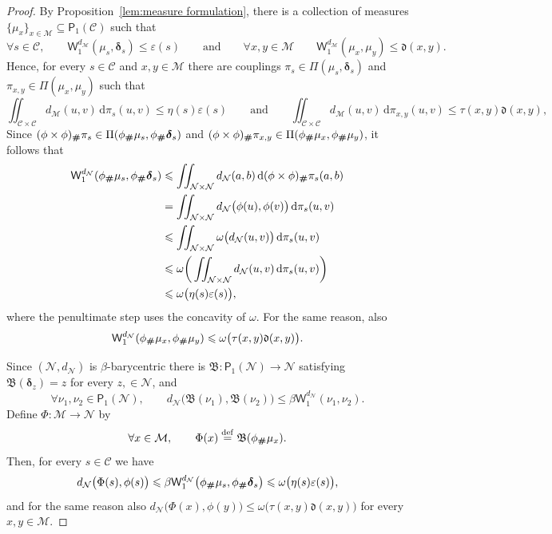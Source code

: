 \documentclass[11pt,reqno]{amsart}
\renewcommand{\le}{\leqslant}
\newcommand{\ud}[0]{\,\mathrm{d}}
\newcommand{\bd}{\boldsymbol{\delta}}
\newcommand{\NN}{\mathcal{N}}
\renewcommand{\bd}{\boldsymbol{\delta}}
\newcommand{\e}{\varepsilon}
\theoremstyle{remark}
\newcommand{\MM}{\mathcal{M}}
\renewcommand{\subset}{\subseteq}
\newcommand{\W}{\mathsf{W}}
\newcommand{\eqdef}{\stackrel{\mathrm{def}}{=}}
\newcommand{\sub}{\mathscr{C}}
\renewcommand{\1}{\mathbf 1}
\begin{document}
\begin{proof} By Proposition~\ref{lem:measure formulation}, there is a collection of measures $\{\mu_x\}_{x\in \MM}\subset  \mathsf{P}_1(\sub)$ such that
$$
\forall s\in \sub,\qquad \W_1^{d_\MM}(\mu_s,\bd_s)\le \e(s) \qquad \mathrm{and}\qquad   \forall x,y\in \MM\qquad \W_1^{d_\MM}(\mu_x,\mu_y)\le \mathfrak{d}(x,y).
$$
Hence, for every $s\in \sub$ and $x,y\in \MM$ there are couplings $\pi_s\in \Pi(\mu_s,\bd_s)$ and $\pi_{x,y}\in \Pi(\mu_x,\mu_y)$ such that
$$
\iint_{\sub\times \sub} d_\MM(u,v)\ud\pi_s(u,v)\le \eta(s)\e(s)\qquad\mathrm{and}\qquad \iint_{\sub\times \sub} d_\MM(u,v)\ud\pi_{x,y}(u,v)\le \tau(x,y)\mathfrak{d}(x,y),
$$
Since $(\phi\times \phi)_{\textbf \#} \pi_{s}\in \Pi(\phi_{\textbf \#} \mu_s,\phi_{\textbf \#} \bd_s)$ and  $(\phi\times \phi)_{\textbf \#} \pi_{x,y}\in \Pi(\phi_{\textbf \#} \mu_x,\phi_{\textbf \#} \mu_y)$, it follows that
\begin{align*}
\W_1^{d_\NN}(\phi_{\textbf \#} \mu_s,\phi_{\textbf \#} \bd_s)&\le \iint_{\NN\times \NN} d_{\NN}(a,b)\ud(\phi\times \phi)_{\textbf \#} \pi_{s}(a,b)\\&=\iint_{\NN\times \NN} d_\NN\big(\phi(u),\phi(v)\big)\ud \pi_s(u,v)\\&
\le \iint_{\NN\times \NN} \omega\big(d_\NN(u,v)\big)\ud \pi_s(u,v)\\&\le \omega\bigg(\iint_{\NN\times \NN} d_\NN(u,v)\ud \pi_s(u,v)\bigg)\\&\le \omega \big(\eta(s)\e(s)\big),
\end{align*}
where the penultimate step uses the concavity of $\omega$. For the same reason, also $$\W_1^{d_\NN}(\phi_{\textbf \#} \mu_x,\phi_{\textbf \#} \mu_y)\le \omega\big(\tau(x,y)\mathfrak{d}(x,y)\big).$$

Since $(\NN,d_\NN)$ is  $\beta$-barycentric there is  $\mathfrak{B}:\mathsf{P}_1(\NN)\to \NN$ satisfying $\mathfrak{B}(\bd_z)=z$ for every $z,\in \NN$, and
$$
\forall \nu_1,\nu_2\in \mathsf{P}_1(\NN),\qquad d_\NN\big(\mathfrak{B}(\nu_1),\mathfrak{B}(\nu_2)\big)\le \beta\W_1^{d_\NN}(\nu_1,\nu_2).
$$
Define $\Phi:\MM\to \NN$ by
$$
\forall x\in \MM,\qquad \Phi(x)\eqdef \mathfrak{B}(\phi_{\textbf \#} \mu_x).
$$
Then, for every $s\in \sub$   we have
$$
d_\NN\big(\Phi(s),\phi(s)\big)\le \beta \W_1^{d_\NN} \big(\phi_{\textbf \#} \mu_s,\phi_{\textbf \#} \bd_s\big)\le \omega \big(\eta(s)\e(s)\big),
$$
and for the same reason also $d_\NN\big(\Phi(x),\phi(y)\big)\le \omega\big(\tau(x,y)\mathfrak{d}(x,y)\big)$ for every $x,y\in \MM$.
\end{proof}
\end{document}
